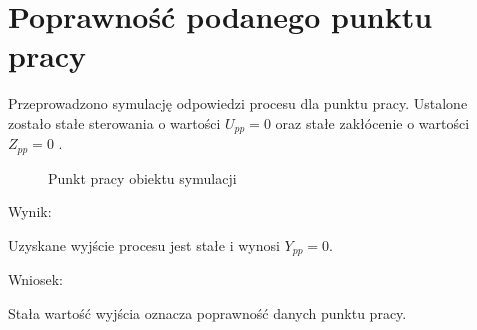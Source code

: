 \section{Poprawność podanego punktu pracy}
\label{projekt:zad1}
Przeprowadzono symulację odpowiedzi procesu dla punktu pracy. 
Ustalone zostało stałe sterowania o wartości $U_{pp} = 0$ oraz stałe zakłócenie o wartości $Z_{pp}=0$ .

\begin{figure}[H] 
    \centering
    
    \caption{Punkt pracy obiektu symulacji}
    \label{projekt:zad1:figure:charstat_u_y_z}
\end{figure}


Wynik: 

Uzyskane wyjście procesu jest stałe i wynosi $Y_{pp}=0$.

Wniosek: 

Stała wartość wyjścia oznacza poprawność danych punktu pracy.

\newpage
